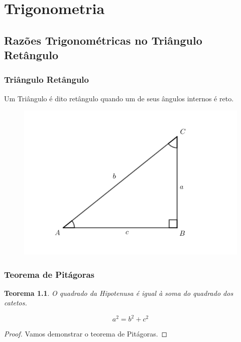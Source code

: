 \chapter{Trigonometria}

\section{Razões Trigonométricas no Triângulo Retângulo}

\subsection{Triângulo Retângulo}


Um Triângulo é dito retângulo quando um de seus ângulos internos é reto. 


\begin{figure}[H]
	\centering
	
	\includegraphics[scale=3.5]{imagens/triangulo-retangulo.png}

\end{figure}

\subsection{Teorema de Pitágoras}
\newtheorem{teorema}{Teorema}
\begin{teorema}
	O quadrado da Hipotenusa é igual à soma do quadrado dos catetos.
\end{teorema}

		$$a^{2}=b^{2}+c^{2}$$ 
		
\newtheorem{proof}{Demonstração}
\begin{proof}
    Vamos demonstrar o teorema de Pitágoras.
\end{proof}

